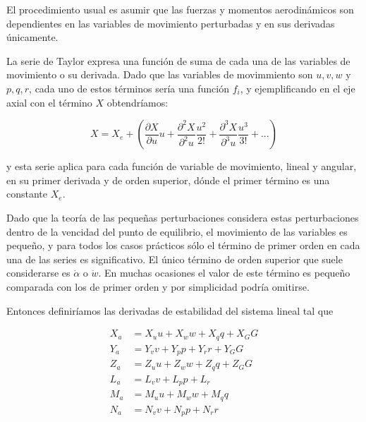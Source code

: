 El procedimiento usual es asumir que las fuerzas y momentos aerodinámicos son dependientes en las variables de movimiento perturbadas y en sus derivadas únicamente.  

La serie de Taylor expresa una función de suma de cada una de las variables de movimiento o su derivada. 
Dado que las variables de movimmiento son $u,v,w$ y $p,q,r$, cada uno de estos términos sería una función $f_i$, y ejemplificando en el eje axial con el término $X$ obtendríamos: 

\begin{equation}
    X = X_{e} + (\frac{\partial X}{\partial u}u+\frac{\partial^2 X}{\partial^2 u}\frac{u^2}{2!}+\frac{\partial^3 X}{\partial^3 u}\frac{u^3}{3!} + ...)
\end{equation}

y esta serie aplica para cada función de variable de movimiento, lineal y angular, en su primer derivada y de orden superior, dónde el primer término es una constante $X_{e}$. 

Dado que la teoría de las pequeñas perturbaciones considera estas perturbaciones dentro de la vencidad del punto de equilibrio, el movimiento de las variables es pequeño, y para todos los casos prácticos sólo el término de primer orden en cada una de las series es significativo. El único término de orden superior que suele considerarse es $ \dot \alpha$ o $\dot w$. En muchas ocasiones el valor de este término es pequeño comparada con los de primer orden y por simplicidad podría omitirse. 

Entonces definiríamos las derivadas de estabilidad del sistema lineal tal que 

\begin{align}
    X_a &= X_u u + X_{w}w + X_q q + X_{G}G \\
    Y_a &= Y_{v}v + Y_{p}p + Y_{r}r + Y_{G}G \\
    Z_a &= Z_u u + Z_{w}w + Z_q q + Z_{G}G  \\
    L_a &= L_{v}v + L_{p}p + L_{r} \\
    M_a &= M_u u + M_{w}w + M_q q \\
    N_a &= N_{v}v + N_{p}p + N_{r}r
\end{align}

